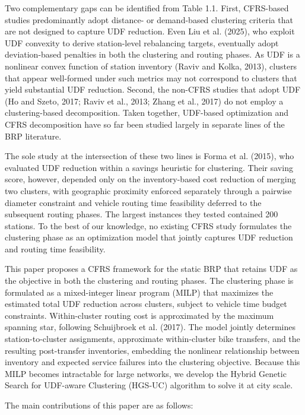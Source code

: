 \documentclass[11pt]{article}
\numberwithin{table}{section}
\numberwithin{figure}{section}
\begin{document}
Two complementary gaps can be identified from Table 1.1. First, CFRS-based studies predominantly adopt distance- or demand-based clustering criteria that are not designed to capture UDF reduction. Even Liu et al. (2025), who exploit UDF convexity to derive station-level rebalancing targets, eventually adopt deviation-based penalties in both the clustering and routing phases. As UDF is a nonlinear convex function of station inventory (Raviv and Kolka, 2013), clusters that appear well-formed under such metrics may not correspond to clusters that yield substantial UDF reduction. Second, the non-CFRS studies that adopt UDF (Ho and Szeto, 2017; Raviv et al., 2013; Zhang et al., 2017) do not employ a clustering-based decomposition. Taken together, UDF-based optimization and CFRS decomposition have so far been studied largely in separate lines of the BRP literature.

The sole study at the intersection of these two lines is Forma et al. (2015), who evaluated UDF reduction within a savings heuristic for clustering. Their saving score, however, depended only on the inventory-based cost reduction of merging two clusters, with geographic proximity enforced separately through a pairwise diameter constraint and vehicle routing time feasibility deferred to the subsequent routing phases. The largest instances they tested contained 200 stations. To the best of our knowledge, no existing CFRS study formulates the clustering phase as an optimization model that jointly captures UDF reduction and routing time feasibility.

This paper proposes a CFRS framework for the static BRP that retains UDF as the objective in both the clustering and routing phases. The clustering phase is formulated as a mixed-integer linear program (MILP) that maximizes the estimated total UDF reduction across clusters, subject to vehicle time budget constraints. Within-cluster routing cost is approximated by the maximum spanning star, following Schuijbroek et al. (2017). The model jointly determines station-to-cluster assignments, approximate within-cluster bike transfers, and the resulting post-transfer inventories, embedding the nonlinear relationship between inventory and expected service failures into the clustering objective. Because this MILP becomes intractable for large networks, we develop the Hybrid Genetic Search for UDF-aware Clustering (HGS-UC) algorithm to solve it at city scale.

The main contributions of this paper are as follows:
\end{document}
